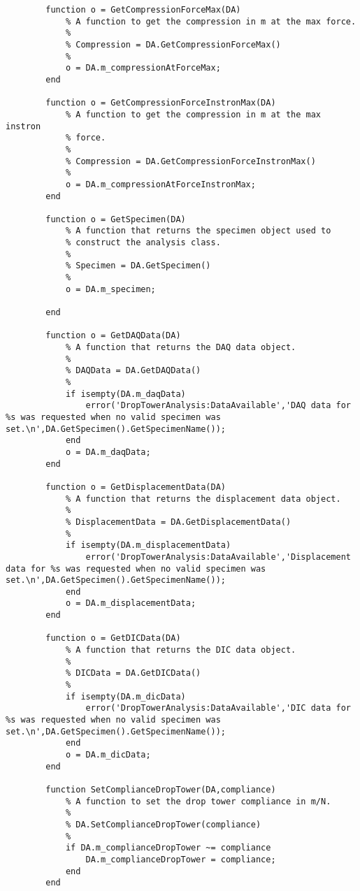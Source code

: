 \begin{lstlisting}
        function o = GetCompressionForceMax(DA)
            % A function to get the compression in m at the max force.
            %
            % Compression = DA.GetCompressionForceMax()
            %
            o = DA.m_compressionAtForceMax;
        end
        
        function o = GetCompressionForceInstronMax(DA)
            % A function to get the compression in m at the max instron
            % force.
            %
            % Compression = DA.GetCompressionForceInstronMax()
            %
            o = DA.m_compressionAtForceInstronMax;
        end
        
        function o = GetSpecimen(DA)
            % A function that returns the specimen object used to 
            % construct the analysis class.
            %
            % Specimen = DA.GetSpecimen()
            %
            o = DA.m_specimen;
            
        end
        
        function o = GetDAQData(DA)
            % A function that returns the DAQ data object.
            %
            % DAQData = DA.GetDAQData()
            %
            if isempty(DA.m_daqData)
                error('DropTowerAnalysis:DataAvailable','DAQ data for %s was requested when no valid specimen was set.\n',DA.GetSpecimen().GetSpecimenName());
            end
            o = DA.m_daqData;
        end
        
        function o = GetDisplacementData(DA)
            % A function that returns the displacement data object.
            %
            % DisplacementData = DA.GetDisplacementData()
            %
            if isempty(DA.m_displacementData)
                error('DropTowerAnalysis:DataAvailable','Displacement data for %s was requested when no valid specimen was set.\n',DA.GetSpecimen().GetSpecimenName());
            end
            o = DA.m_displacementData;
        end
        
        function o = GetDICData(DA)
            % A function that returns the DIC data object.
            %
            % DICData = DA.GetDICData()
            %
            if isempty(DA.m_dicData)
                error('DropTowerAnalysis:DataAvailable','DIC data for %s was requested when no valid specimen was set.\n',DA.GetSpecimen().GetSpecimenName());
            end
            o = DA.m_dicData;
        end
        
        function SetComplianceDropTower(DA,compliance)
            % A function to set the drop tower compliance in m/N.
            %
            % DA.SetComplianceDropTower(compliance)
            %
            if DA.m_complianceDropTower ~= compliance
                DA.m_complianceDropTower = compliance;
            end
        end
        

\end{lstlisting}
